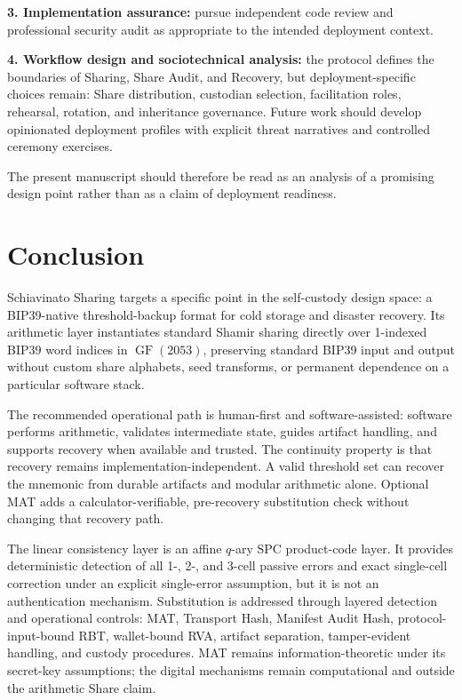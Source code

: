 \documentclass[11pt]{article}
\newcommand{\GF}{\operatorname{GF}}
\begin{document}
\textbf{3. Implementation assurance:} pursue independent code review and professional security audit as appropriate to the intended deployment context.

\textbf{4. Workflow design and sociotechnical analysis:} the protocol defines the boundaries of Sharing, Share Audit, and Recovery, but deployment-specific choices remain: Share distribution, custodian selection, facilitation roles, rehearsal, rotation, and inheritance governance. Future work should develop opinionated deployment profiles with explicit threat narratives and controlled ceremony exercises.

The present manuscript should therefore be read as an analysis of a promising design point rather than as a claim of deployment readiness.

\section{Conclusion}
\label{sec:conclusion}

Schiavinato Sharing targets a specific point in the self-custody design space: a BIP39-native threshold-backup format for cold storage and disaster recovery. Its arithmetic layer instantiates standard Shamir sharing directly over 1-indexed BIP39 word indices in $\GF(2053)$, preserving standard BIP39 input and output without custom share alphabets, seed transforms, or permanent dependence on a particular software stack.

The recommended operational path is human-first and software-assisted: software performs arithmetic, validates intermediate state, guides artifact handling, and supports recovery when available and trusted. The continuity property is that recovery remains implementation-independent. A valid threshold set can recover the mnemonic from durable artifacts and modular arithmetic alone. Optional MAT adds a calculator-verifiable, pre-recovery substitution check without changing that recovery path.

The linear consistency layer is an affine $q$-ary SPC product-code layer. It provides deterministic detection of all 1-, 2-, and 3-cell passive errors and exact single-cell correction under an explicit single-error assumption, but it is not an authentication mechanism. Substitution is addressed through layered detection and operational controls: MAT, Transport Hash, Manifest Audit Hash, protocol-input-bound RBT, wallet-bound RVA, artifact separation, tamper-evident handling, and custody procedures. MAT remains information-theoretic under its secret-key assumptions; the digital mechanisms remain computational and outside the arithmetic Share claim.
\end{document}
